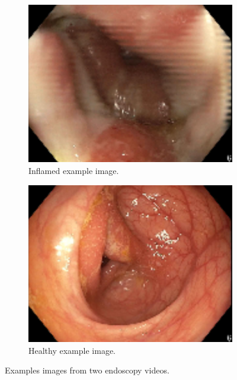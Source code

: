 \begin{figure}[H]
\begin{subfigure}{0.4\linewidth}
	\end{subfigure}
	\\
	\begin{subfigure}{0.4\linewidth}
		\centering
		\includegraphics[width=\linewidth]{Materials/Results/Intro/idx_4_frame_800}
		\caption{Inflamed example image.}
	\end{subfigure}
	\hspace{0.5cm}
	\begin{subfigure}{0.4\linewidth}
		\centering
		\includegraphics[width=\linewidth]{Materials/Results/Intro/idx_4_frame_3000}
		\caption{Healthy example image.}
	\end{subfigure}
	\caption{Examples images from two endoscopy videos.}
	\label{exampleFrames}
\end{figure}





